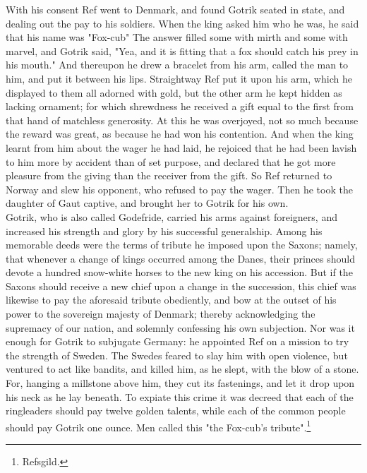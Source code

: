 \documentclass[10pt,a4paper]{report}
\begin{document}
With his consent Ref went to Denmark, and found Gotrik seated in state, and dealing out the pay to his soldiers. When the king asked him who he was, he said that his name was "Fox-cub" The answer filled some with mirth and some with marvel, and Gotrik said, "Yea, and it is fitting that a fox should catch his prey in his mouth." And thereupon he drew a bracelet from his arm, called the man to him, and put it between his lips. Straightway Ref put it upon his arm, which he displayed to them all adorned with gold, but the other arm he kept hidden as lacking ornament; for which shrewdness he received a gift equal to the first from that hand of matchless generosity. At this he was overjoyed, not so much because the reward was great, as because he had won his contention. And when the king learnt from him about the wager he had laid, he rejoiced that he had been lavish to him more by accident than of set purpose, and declared that he got more pleasure from the giving than the receiver from the gift. So Ref returned to Norway and slew his opponent, who refused to pay the wager. Then he took the daughter of Gaut captive, and brought her to Gotrik for his own.\\

Gotrik, who is also called Godefride, carried his arms against foreigners, and increased his strength and glory by his successful generalship. Among his memorable deeds were the terms of tribute he imposed upon the Saxons; namely, that whenever a change of kings occurred among the Danes, their princes should devote a hundred snow-white horses to the new king on his accession. But if the Saxons should receive a new chief upon a change in the succession, this chief was likewise to pay the aforesaid tribute obediently, and bow at the outset of his power to the sovereign majesty of Denmark; thereby acknowledging the supremacy of our nation, and solemnly confessing his own subjection. Nor was it enough for Gotrik to subjugate Germany: he appointed Ref on a mission to try the strength of Sweden. The Swedes feared to slay him with open violence, but ventured to act like bandits, and killed him, as he slept, with the blow of a stone. For, hanging a millstone above him, they cut its fastenings, and let it drop upon his neck as he lay beneath. To expiate this crime it was decreed that each of the ringleaders should pay twelve golden talents, while each of the common people should pay Gotrik one ounce. Men called this "the Fox-cub's tribute".\footnote{Refsgild.}\\
\end{document}
